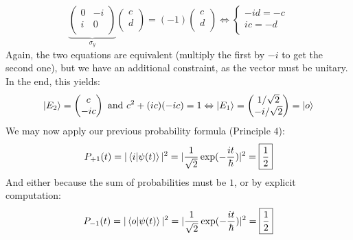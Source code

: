 \documentclass[solutions.tex]{subfiles}
\begin{document}
\[
	\underbrace{\begin{pmatrix}
		0 & -i \\
		i &  0 \\
	\end{pmatrix}}_{\sigma_y} \begin{pmatrix} c \\ d \\ \end{pmatrix}
		= (-1)\begin{pmatrix} c \\ d \\ \end{pmatrix}
	\Leftrightarrow \begin{cases}
		-id = -c \\
		ic = -d \\
	\end{cases}
\]
Again, the two equations are equivalent (multiply the first by $-i$ to
get the second one), but we have an additional constraint, as the
vector must be unitary. In the end, this yields:
\[
	|E_2\rangle = \begin{pmatrix}
		c \\
		-ic \\
	\end{pmatrix} \text{ and } c^2+(ic)(-ic) = 1
	\Leftrightarrow
	|E_1\rangle = \begin{pmatrix}
		1/\sqrt2 \\
		-i/\sqrt2 \\
	\end{pmatrix} = |o\rangle
\]
We may now apply our previous probability formula (Principle $4$):
\[
	P_{+1}(t) = |\left\langle i \middle| \psi(t) \right\rangle|^2 =
		|\frac1{\sqrt2}\exp(-\frac{it}\hbar)|^2 = \boxed{\frac12}
\]
And either because the sum of probabilities must be $1$, or by
explicit computation:
\[
	P_{-1}(t) = |\left\langle o \middle| \psi(t) \right\rangle|^2 =
		|\frac1{\sqrt2}\exp(-\frac{it}\hbar)|^2 = \boxed{\frac12}
\]
\end{document}
